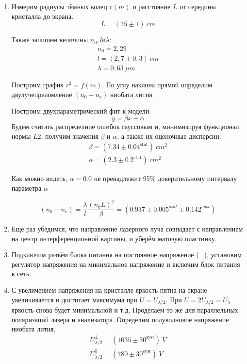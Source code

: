 \begin{enumerate}
    \item
    Измерим радиусы тёмных колец $r(m)$ и расстояние $L$ от середины кристалла до экрана.
    $$ L = (75\pm 1)~cm$$
    
    Также запишем величины $n_0, l и \lambda$:
    \begin{gather*}
        n_0 = 2,29\\
        l = (2,7 \pm 0,3)~cm\\
        \lambda = 0,63~\mu m
    \end{gather*}
    
    Построим график $r^2 = f(m)$. По углу наклона прямой определим двулучепреломление $(n_0 - n_{\text{e}})$ ниобата лития.
    
    \begin{figure}[h]
    \end{figure}
    
    Построим двухпараметрический фит к модели:
    $$ y = \beta x + \alpha $$
    Будем считать распределние ошибок гауссовым и,  минимизируя функционал нормы $L2$, получим значения $\beta$ и $\alpha$, а также их оценочные дисперсии.
    \begin{gather*}
    \beta = (7.34\pm0.04^{\text{stat}})~{cm^2}\\
    \alpha = (2.3\pm0.2^{\text{stat}})~{cm^2}
    \end{gather*}
    
    Как можно видеть, $\alpha = 0.0$ не пренадлежит 95\% доверительному интервалу параметра $\alpha$
    
    $$(n_0 - n_{\text{e}}) = \frac{\lambda}{l} \frac{(n_0 L)^2}{\beta} = (0.937 \pm 0.005^{stat}\pm0.142^{syst})$$
    
    \item
    Ещё раз убедимся, что направление лазерного луча совпадает с направлением на центр интерференционной картины, и уберём матовую пластинку. 
    
    \item
    Подключим разъём блока питания на постоянное напряжение (=), установим регулятор напряжения на минимальное напряжение и включим блок питания в сеть.    
    
    \item
    С увеличением напряжения на кристалле яркость пятна на экране увеличивается и достигает максимума при $U = U_{\lambda/2}$. При $U = 2U_{\lambda/2} = U_\lambda$ яркость снова будет минимальной и т.д. Проделаем то же для параллельных поляризаций лазера и анализатора. Определим полуволновое напряжение ниобата лития.
    \begin{gather*}
    U_{\lambda/2}^{\perp} = (1035 \pm 30^{\text{syst}})~V\\
    U_{\lambda/2}^{\parallel} = (780 \pm 30^{\text{syst}})~V
    \end{gather*}
    

\end{enumerate}
